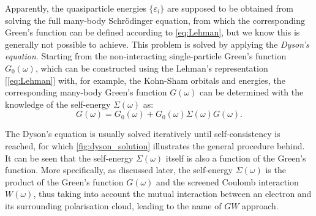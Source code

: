 Apparently, the quasiparticle energies $\{\varepsilon_i\}$ are supposed to be obtained from solving the full many-body Schr\"{o}dinger equation, from which the corresponding Green's function can be defined according to \cref{eq:Lehman}, but we know this is generally not possible to achieve. This problem is solved by applying the \emph{Dyson's equation}.\cite{dyson1949} Starting from the non-interacting single-particle Green's function $G_0(\omega)$, which can be constructed using the Lehman's representation [\cref{eq:Lehman}] with, for example, the Kohn-Sham orbitals and energies, the corresponding many-body Green's function $G(\omega)$ can be determined with the knowledge of the self-energy $\Sigma(\omega)$ as:
\begin{equation}
    \label{eq:Dyson_equation}
    G(\omega)=G_0(\omega)+G_0(\omega)\Sigma(\omega)G(\omega).
\end{equation}


The Dyson's equation is usually solved iteratively until self-consistency is reached, for which \cref{fig:dyson_solution} illustrates the general procedure behind. It can be seen that the self-energy $\Sigma(\omega)$ itself is also a function of the Green's function. More specifically, as discussed later,  the self-energy $\Sigma(\omega)$ is the product of the Green's function $G(\omega)$ and the screened Coulomb interaction $W(\omega)$, thus taking into account the mutual interaction between an electron and its surrounding polarisation cloud, leading to the name of $GW$ approach. 

